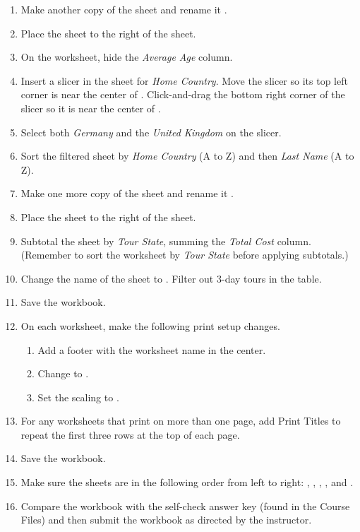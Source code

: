 \begin{enumerate}
	\item Make another copy of the  sheet and rename it . 
	\item Place the  sheet to the right of the  sheet. 
	\item On the  worksheet, hide the \textit{Average Age} column.
	\item Insert a slicer in the  sheet for \textit{Home Country}. Move the slicer so its top left corner is near the center of . Click-and-drag the bottom right corner of the slicer so it is near the center of .
	\item Select both \textit{Germany} and the \textit{United Kingdom} on the slicer.
	\item Sort the filtered sheet by \textit{Home Country} (A to Z) and then \textit{Last Name} (A to Z).

	\item Make one more copy of the  sheet and rename it .
	\item Place the  sheet to the right of the  sheet. 
	\item Subtotal the sheet by \textit{Tour State}, summing the \textit{Total Cost} column. (Remember to sort the worksheet by \textit{Tour State} before applying subtotals.)
	\item Change the name of the  sheet to . Filter out $ 3 $-day tours in the table.

	\item Save the  workbook.
	\item On each worksheet, make the following print setup changes.

	\begin{enumerate}
		\item Add a footer with the worksheet name in the center.
		\item Change to .
		\item Set the scaling to .
	\end{enumerate}

	\item For any worksheets that print on more than one page, add Print Titles to repeat the first three rows at the top of each page.
	\item Save the  workbook.
	\item Make sure the sheets are in the following order from left to right: , , , , and .
	\item Compare the workbook with the self-check answer key (found in the Course Files) and then submit the  workbook as directed by the instructor.


\end{enumerate}
